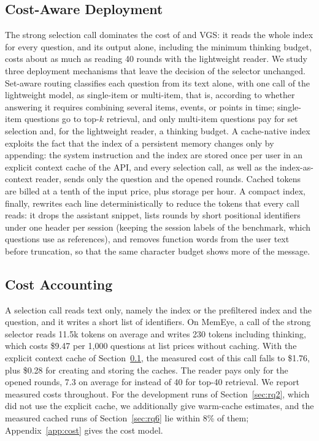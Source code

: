 \subsection{Cost-Aware Deployment}
\label{sec:deploy}

The strong selection call dominates the cost of \qss{} and VGS: it reads the whole index for every question, and its output alone, including the minimum thinking budget, costs about as much as reading 40 rounds with the lightweight reader. We study three deployment mechanisms that leave the decision of the selector unchanged. Set-aware routing classifies each question from its text alone, with one call of the lightweight model, as single-item or multi-item, that is, according to whether answering it requires combining several items, events, or points in time; single-item questions go to top-$k$ retrieval, and only multi-item questions pay for set selection and, for the lightweight reader, a thinking budget. A cache-native index exploits the fact that the index of a persistent memory changes only by appending: the system instruction and the index are stored once per user in an explicit context cache of the API, and every selection call, as well as the index-as-context reader, sends only the question and the opened rounds. Cached tokens are billed at a tenth of the input price, plus storage per hour. A compact index, finally, rewrites each line deterministically to reduce the tokens that every call reads: it drops the assistant snippet, lists rounds by short positional identifiers under one header per session (keeping the session labels of the benchmark, which questions use as references), and removes function words from the user text before truncation, so that the same character budget shows more of the message.

\subsection{Cost Accounting}
\label{sec:cost}

A selection call reads text only, namely the index or the prefiltered index and the question, and it writes a short list of identifiers. On MemEye, a call of the strong selector reads 11.5k tokens on average and writes 230 tokens including thinking, which costs \$9.47 per 1,000 questions at list prices without caching. With the explicit context cache of Section~\ref{sec:deploy}, the measured cost of this call falls to \$1.76, plus \$0.28 for creating and storing the caches. The reader pays only for the opened rounds, 7.3 on average for \qss{} instead of 40 for top-40 retrieval. We report measured costs throughout. For the development runs of Section~\ref{sec:rq2}, which did not use the explicit cache, we additionally give warm-cache estimates, and the measured cached runs of Section~\ref{sec:rq6} lie within 8\% of them; Appendix~\ref{app:cost} gives the cost model.
